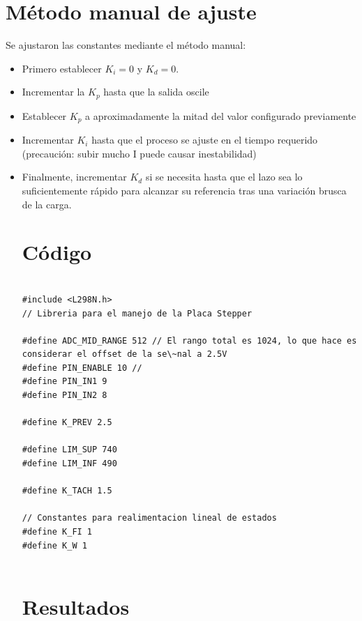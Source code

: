 \documentclass{article}
\begin{document}
\section{Método manual de ajuste}
Se ajustaron las constantes mediante el método manual:
\begin{itemize}
  \item Primero establecer $K_i=0$ y $K_d=0$. 
  \item Incrementar la $K_p$ hasta que la salida oscile
  \item Establecer $K_p$ a aproximadamente la mitad del valor configurado previamente
  \item Incrementar $K_i$ hasta que el proceso se ajuste en el tiempo requerido (precaución: subir mucho I puede causar inestabilidad)
  \item Finalmente, incrementar $K_d$ si se necesita hasta que el lazo sea lo suficientemente rápido para alcanzar su referencia tras una variación brusca de la carga.

 
\newpage
\section{Código}
\begin{lstlisting}

#include <L298N.h>
// Libreria para el manejo de la Placa Stepper

#define ADC_MID_RANGE 512 // El rango total es 1024, lo que hace es considerar el offset de la se\~nal a 2.5V
#define PIN_ENABLE 10 // 
#define PIN_IN1 9
#define PIN_IN2 8

#define K_PREV 2.5

#define LIM_SUP 740
#define LIM_INF 490

#define K_TACH 1.5

// Constantes para realimentacion lineal de estados
#define K_FI 1
#define K_W 1


\end{lstlisting}

 
\newpage
\section{Resultados}
 
  
\end{itemize}
 
\end{document}
